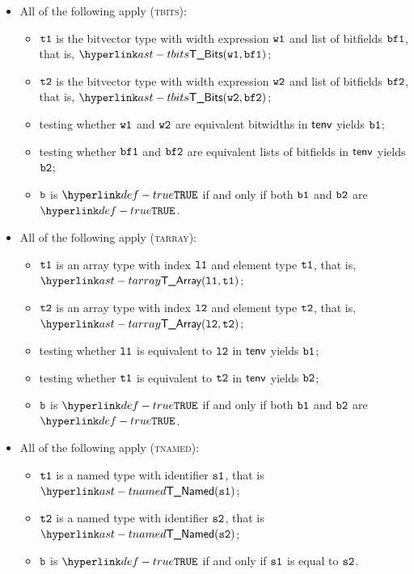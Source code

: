 \begin{itemize}
  \item All of the following apply (\textsc{tbits}):
  \begin{itemize}
    \item $\texttt{t1}$ is the bitvector type with width expression $\texttt{w1}$ and list of bitfields $\texttt{bf1}$, that is, $\TBits(\vwone, \bfone)$;
    \item $\texttt{t2}$ is the bitvector type with width expression $\texttt{w2}$ and list of bitfields $\texttt{bf2}$, that is, $\TBits(\vwtwo, \bftwo)$;
    \item testing whether $\texttt{w1}$ and $\texttt{w2}$ are equivalent bitwidths in $\textsf{tenv}$ yields $\texttt{b1}$\ProseOrTypeError;
    \item testing whether $\texttt{bf1}$ and $\texttt{bf2}$ are equivalent lists of bitfields in $\textsf{tenv}$ yields $\texttt{b2}$\ProseOrTypeError;
    \item $\texttt{b}$ is $\True$ if and only if both $\texttt{b1}$ and $\texttt{b2}$ are $\True$.
  \end{itemize}

  \item All of the following apply (\textsc{tarray}):
  \begin{itemize}
    \item $\texttt{t1}$ is an array type with index $\texttt{l1}$ and element type $\texttt{t1}$, that is, $\TArray(\vlone, \vtone)$;
    \item $\texttt{t2}$ is an array type with index $\texttt{l2}$ and element type $\texttt{t2}$, that is, $\TArray(\vltwo, \vttwo)$;
    \item testing whether $\texttt{l1}$ is equivalent to $\texttt{l2}$ in $\textsf{tenv}$ yields $\texttt{b1}$\ProseOrTypeError;
    \item testing whether $\texttt{t1}$ is equivalent to $\texttt{t2}$ in $\textsf{tenv}$ yields $\texttt{b2}$\ProseOrTypeError;
    \item $\texttt{b}$ is $\True$ if and only if both $\texttt{b1}$ and $\texttt{b2}$ are $\True$.
  \end{itemize}

  \item All of the following apply (\textsc{tnamed}):
  \begin{itemize}
    \item $\texttt{t1}$ is a named type with identifier $\texttt{s1}$, that is $\TNamed(\vsone)$;
    \item $\texttt{t2}$ is a named type with identifier $\texttt{s2}$, that is $\TNamed(\vstwo)$;
    \item $\texttt{b}$ is $\True$ if and only if $\texttt{s1}$ is equal to $\texttt{s2}$.
  \end{itemize}


\end{itemize}
